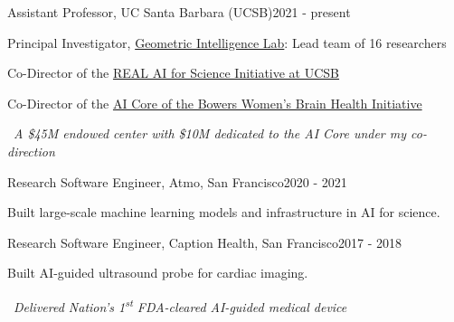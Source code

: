
\begin{joblong}{Assistant Professor, UC Santa Barbara (UCSB)}{2021 - present}
\item Principal Investigator, \href{https://gi.ece.ucsb.edu/}{Geometric Intelligence Lab}: Lead team of 16 researchers
\item Co-Director of the \href{https://www.ai.ece.ucsb.edu/}{REAL AI for Science Initiative at UCSB}
\item Co-Director of the \href{https://wbhi.ucsb.edu/}{AI Core of the Bowers Women's Brain Health Initiative}
\item {\small{\faAward}}~\textit{A \$45M endowed center with \$10M dedicated to the AI Core under my co-direction}
\end{joblong}

\begin{joblong}{Research Software Engineer, Atmo, San Francisco}{2020 - 2021}
\item Built large-scale machine learning models and infrastructure in AI for science. 
\end{joblong}

\begin{joblong}{Research Software Engineer, Caption Health, San Francisco}{2017 - 2018}
\item Built AI-guided ultrasound probe for cardiac imaging. 
\item {\small{\faAward}}~\textit{Delivered Nation's 1\textsuperscript{st} FDA-cleared AI-guided medical device}
\end{joblong}

